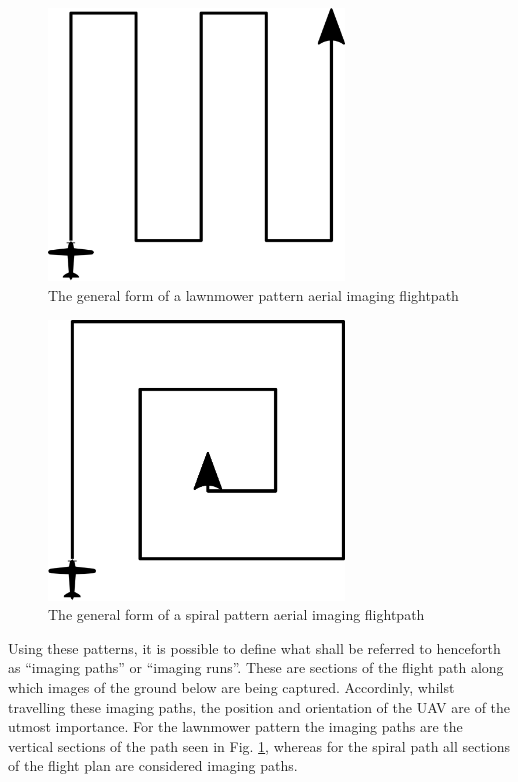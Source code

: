 \begin{figure}[htbp!] 
\centering    
\includegraphics[width=0.7\textwidth]{SimpleLawnmower}
\caption[A simple lawnmower pattern flightpath]{The general form of a lawnmower pattern aerial imaging flightpath}
\label{fig:simplelawnmower}
\end{figure}

\begin{figure}[htbp!] 
\centering    
\includegraphics[width=0.7\textwidth]{SimpleSpiral}
\caption[A simple spiral pattern flightpath]{The general form of a spiral pattern aerial imaging flightpath}
\label{fig:simplespiral}
\end{figure}

Using these patterns, it is possible to define what shall be referred to henceforth as ``imaging paths'' or ``imaging runs''. These are sections of the flight path along which images of the ground below are being captured. Accordinly, whilst travelling these imaging paths, the position and orientation of the UAV are of the utmost importance. For the lawnmower pattern the imaging paths are the vertical sections of the path seen in Fig. \ref{fig:simplelawnmower}, whereas for the spiral path all sections of the flight plan are considered imaging paths. 


